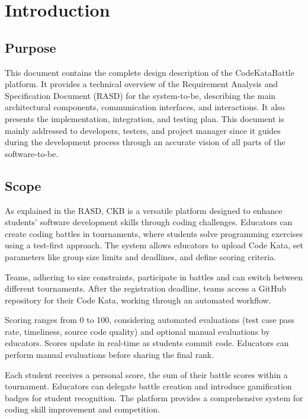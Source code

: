 \chapter{Introduction}

\section{Purpose}
This document contains the complete design description of the CodeKataBattle platform. 
It provides a technical overview of the Requirement Analysis and Specification Document (RASD) for the system-to-be, describing the main architectural components, communication interfaces, and interactions. 
It also presents the implementation, integration, and testing plan. 
This document is mainly addressed to developers, testers, and project manager since it guides during the development process through an accurate vision of all parts of the software-to-be. 

\section{Scope}
As explained in the RASD, CKB is a versatile platform designed to enhance students' software development skills through coding challenges. 
Educators can create coding battles in tournaments, where students solve programming exercises using a test-first approach. 
The system allows educators to upload Code Kata, set parameters like group size limits and deadlines, and define scoring criteria.

Teams, adhering to size constraints, participate in battles and can switch between different tournaments. 
After the registration deadline, teams access a GitHub repository for their Code Kata, working through an automated workflow.

Scoring ranges from 0 to 100, considering automated evaluations (test case pass rate, timeliness, source code quality) and optional manual evaluations by educators. 
Scores update in real-time as students commit code. 
Educators can perform manual evaluations before sharing the final rank.

Each student receives a personal score, the sum of their battle scores within a tournament. 
Educators can delegate battle creation and introduce gamification badges for student recognition. 
The platform provides a comprehensive system for coding skill improvement and competition.

